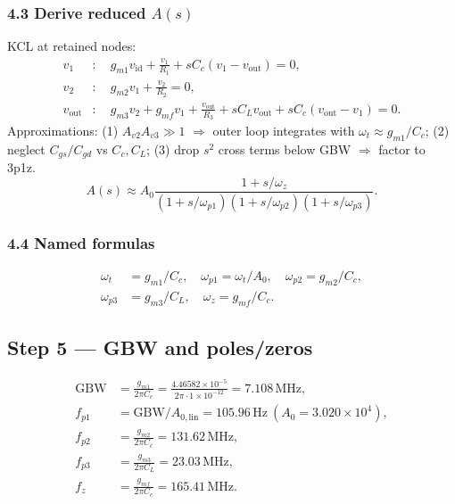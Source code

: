 \documentclass[11pt]{article}
\begin{document}
\subsubsection{4.3 Derive reduced \(A(s)\)}
KCL at retained nodes:
\begin{align*}
v_1&: \quad g_{m1}v_{\mathrm{id}}+\frac{v_1}{R_1}+s C_c(v_1-v_{\mathrm{out}})=0,\\
v_2&: \quad g_{m2}v_1+\frac{v_2}{R_2}=0,\\
v_{\mathrm{out}}&: \quad g_{m3}v_2+g_{mf}v_1+\frac{v_{\mathrm{out}}}{R_3}+s C_L v_{\mathrm{out}}+s C_c(v_{\mathrm{out}}-v_1)=0.
\end{align*}
Approximations: (1) \(A_{v2}A_{v3}\gg1\) \(\Rightarrow\) outer loop integrates with \(\omega_t\approx g_{m1}/C_c\);
(2) neglect \(C_{gs}/C_{gd}\) vs \(C_c,C_L\);
(3) drop \(s^2\) cross terms below GBW \(\Rightarrow\) factor to 3p1z.
\[
A(s)\approx A_0\frac{1+s/\omega_z}{(1+s/\omega_{p1})(1+s/\omega_{p2})(1+s/\omega_{p3})}.
\]

\subsubsection{4.4 Named formulas}
\begin{align*}
\omega_t&=g_{m1}/C_c,\quad
\omega_{p1}=\omega_t/A_0,\quad
\omega_{p2}=g_{m2}/C_c,\\
\omega_{p3}&=g_{m3}/C_L,\quad
\omega_z=g_{mf}/C_c.
\end{align*}

\subsection{Step 5 --- GBW and poles/zeros}
\begin{align*}
\mathrm{GBW}&=\frac{g_{m1}}{2\pi C_c}=\frac{4.46582\times10^{-5}}{2\pi\cdot1\times10^{-12}}=7.108\,\mathrm{MHz},\\
f_{p1}&=\mathrm{GBW}/A_{0,\mathrm{lin}}=105.96\,\mathrm{Hz}\ (A_0=3.020\times10^{4}),\\
f_{p2}&=\frac{g_{m2}}{2\pi C_c}=131.62\,\mathrm{MHz},\\
f_{p3}&=\frac{g_{m3}}{2\pi C_L}=23.03\,\mathrm{MHz},\\
f_{z}&=\frac{g_{mf}}{2\pi C_c}=165.41\,\mathrm{MHz}.
\end{align*}
\end{document}
